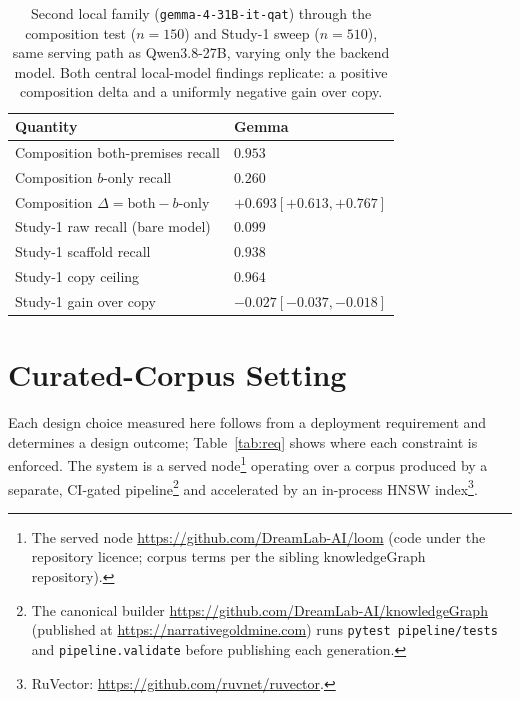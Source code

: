 \documentclass[10pt,twocolumn]{article}
\begin{document}
\begin{table}[t]\centering\small
\caption{Second local family (\texttt{gemma-4-31B-it-qat}) through the composition test
($n=150$) and Study-1 sweep ($n=510$), same serving path as Qwen3.8-27B, varying only the
backend model. Both central local-model findings replicate: a positive composition delta and a
uniformly negative gain over copy.}
\label{tab:gemma}
\begin{tabular}{@{}p{}l@{}}
\toprule
Quantity & Gemma \\
\midrule
Composition both-premises recall & $0.953$ \\
Composition $b$-only recall       & $0.260$ \\
Composition $\Delta=\text{both}-b\text{-only}$ & $+0.693$\quad$[+0.613,+0.767]$ \\
\midrule
Study-1 raw recall (bare model)   & $0.099$ \\
Study-1 scaffold recall           & $0.938$ \\
Study-1 copy ceiling              & $0.964$ \\
Study-1 gain over copy            & $-0.027$\quad$[-0.037,-0.018]$ \\
\bottomrule
\end{tabular}
\end{table}



\section{Curated-Corpus Setting}\label{sec:setting}
Each design choice measured here follows from a deployment requirement and determines a design outcome; Table~\ref{tab:req} shows where each constraint is enforced. The system is a served node\footnote{The served node \url{https://github.com/DreamLab-AI/loom} (code under the repository licence; corpus terms per the sibling knowledgeGraph repository).} operating over a corpus produced by a separate, CI-gated pipeline\footnote{The canonical builder \url{https://github.com/DreamLab-AI/knowledgeGraph} (published at \url{https://narrativegoldmine.com}) runs \texttt{pytest pipeline/tests} and \texttt{pipeline.validate} before publishing each generation.} and accelerated by an in-process HNSW index\footnote{RuVector: \url{https://github.com/ruvnet/ruvector}.}.
\end{document}
